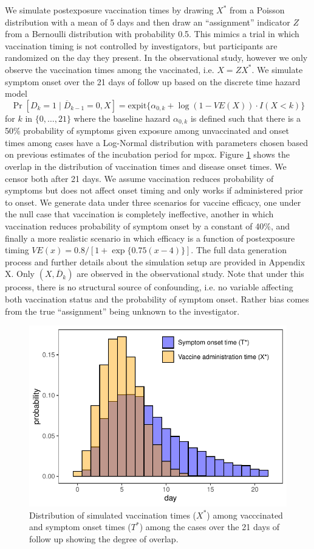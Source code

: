 \documentclass[11pt]{article}
\begin{document}
We simulate postexposure vaccination times by drawing $X^*$ from a Poisson distribution with a mean of 5 days and then draw an ``assignment'' indicator $Z$ from a Bernoulli distribution with probability 0.5. This mimics a trial in which vaccination timing is not controlled by investigators, but participants are randomized on the day they present. In the observational study, however we only observe the vaccination times among the vaccinated, i.e. $X = ZX^* $. We simulate symptom onset over the 21 days of follow up based on the discrete time hazard model 
$$\Pr[D_k = 1 \mid \overline{D}_{k-1} = 0, X] =  \text{expit}\{\alpha_{0,k} + \log(1 - VE(X)) \cdot I(X < k)\}$$
for $k$ in $\{0, \ldots, 21\}$ where the baseline hazard $\alpha_{0,k}$ is defined such that there is a 50\% probability of symptoms given exposure among unvaccinated and onset times among cases have a Log-Normal distribution with parameters chosen based on previous estimates of the incubation period for mpox. Figure \ref{fig:sim_overlap} shows the overlap in the distribution of vaccination times and disease onset times. We censor both after 21 days. We assume vaccination reduces probability of symptoms but does not affect onset timing and only works if administered prior to onset. We generate data under three scenarios for vaccine efficacy, one under the null case that vaccination is completely ineffective, another in which vaccination reduces probability of symptom onset by a constant of 40\%, and finally a more realistic scenario in which efficacy is a function of postexposure timing $VE(x) = 0.8/[1+\exp\{0.75(x-4)\}]$. The full data generation process and further details about the simulation setup are provided in Appendix X. Only $(X, \overline{D}_k)$ are observed in the observational study. Note that under this process, there is no structural source of confounding, i.e. no variable affecting both vaccination status and the probability of symptom onset. Rather bias comes from the true ``assignment'' being unknown to the investigator.

\begin{figure}[t]
    \centering
    \includegraphics{../3_figures/dist.pdf}
    \caption{Distribution of simulated vaccination times ($X^*$) among vacccinated and symptom onset times ($T^*$) among the cases over the 21 days of follow up showing the degree of overlap.}
    \label{fig:sim_overlap}
\end{figure}
\end{document}
